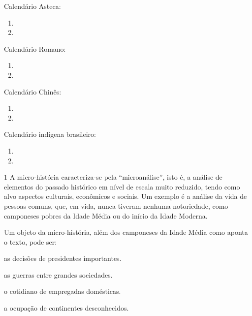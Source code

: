 Calendário Asteca:

\begin{enumerate}
\item {}

\item {}
\end{enumerate}

Calendário Romano:

\begin{enumerate}
\item 

\item 
\end{enumerate}


Calendário Chinês:

\begin{enumerate}
\item {}

\item {}
\end{enumerate}

Calendário indígena brasileiro:

\begin{enumerate}
\item {}

\item {}
\end{enumerate}


\num{1} A micro-história caracteriza-se pela ``microanálise'', isto é, a
análise de elementos do passado histórico em nível de escala muito
reduzido, tendo como alvo aspectos culturais, econômicos e sociais. Um
exemplo é a análise da vida de pessoas comuns, que, em vida, nunca
tiveram nenhuma notoriedade, como camponeses pobres da Idade Média ou do
início da Idade Moderna.

Um objeto da micro-história, além dos camponeses da Idade Média como
aponta o texto, pode ser:

\begin{escolha}
\item as decisões de presidentes importantes.

\item as guerras entre grandes sociedades.

\item o cotidiano de empregadas domésticas.

\item a ocupação de continentes desconhecidos.
\end{escolha}

